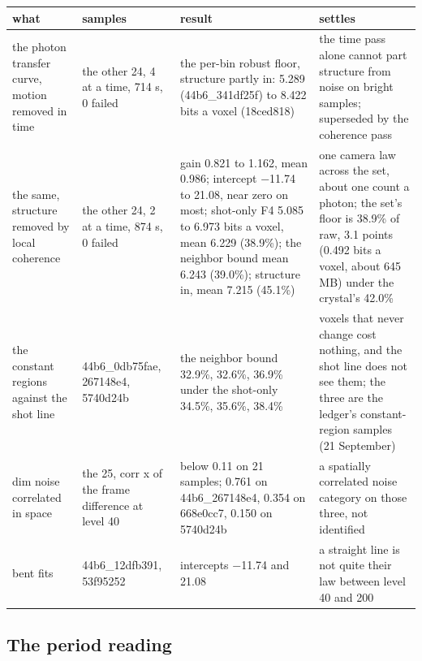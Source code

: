 {\footnotesize
\setlength{\tabcolsep}{6pt}
\begin{longtable}{>{\RaggedRight\arraybackslash}p{}>{\RaggedRight\arraybackslash}p{}>{\RaggedRight\arraybackslash}p{}>{\RaggedRight\arraybackslash}p{}}
\toprule
what & samples & result & settles \\
\midrule
\endhead
the photon transfer curve, motion removed in time & the other 24, 4 at a time, 714 s, 0 failed & the per-bin robust floor, structure partly in: 5.289 (44b6\_\allowbreak{}341df25f) to 8.422 bits a voxel (18ced818) & the time pass alone cannot part structure from noise on bright samples; superseded by the coherence pass \\
the same, structure removed by local coherence & the other 24, 2 at a time, 874 s, 0 failed & gain 0.821 to 1.162, mean 0.986; intercept −11.74 to 21.08, near zero on most; shot-only F4 5.085 to 6.973 bits a voxel, mean 6.229 (38.9\%); the neighbor bound mean 6.243 (39.0\%); structure in, mean 7.215 (45.1\%) & one camera law across the set, about one count a photon; the set's floor is 38.9\% of raw, 3.1 points (0.492 bits a voxel, about 645 MB) under the crystal's 42.0\% \\
the constant regions against the shot line & 44b6\_\allowbreak{}0db75fae, 267148e4, 5740d24b & the neighbor bound 32.9\%, 32.6\%, 36.9\% under the shot-only 34.5\%, 35.6\%, 38.4\% & voxels that never change cost nothing, and the shot line does not see them; the three are the ledger's constant-region samples (21 September) \\
dim noise correlated in space & the 25, corr x of the frame difference at level 40 & below 0.11 on 21 samples; 0.761 on 44b6\_\allowbreak{}267148e4, 0.354 on 668e0cc7, 0.150 on 5740d24b & a spatially correlated noise category on those three, not identified \\
bent fits & 44b6\_\allowbreak{}12dfb391, 53f95252 & intercepts −11.74 and 21.08 & a straight line is not quite their law between level 40 and 200 \\
\bottomrule
\end{longtable}
}

\subsection{\texorpdfstring{The period reading}{The period reading}}

